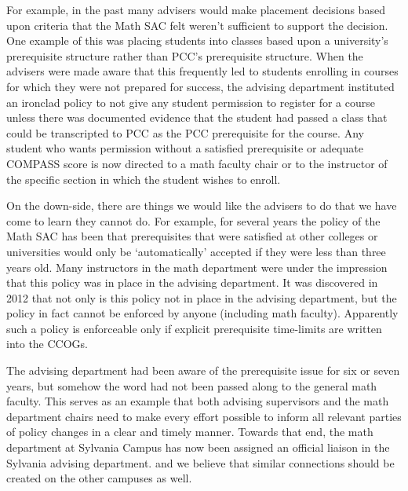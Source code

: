For example, in the past many advisers would make placement decisions based upon criteria that the Math SAC felt weren't sufficient to support the decision.   One example of this was placing students into classes based upon a  university's prerequisite structure rather than PCC's prerequisite structure.   When the advisers were made aware that this frequently led to students enrolling in courses for which they were not prepared for success, the advising department instituted an ironclad policy to not give any student permission to register for a course unless there was documented evidence that the student had passed a class that could be transcripted to PCC as the PCC prerequisite for the course.  Any student who wants permission without a satisfied prerequisite or adequate COMPASS score is now directed to a math faculty chair or to the instructor of the specific section in which the student wishes to enroll.

On the down-side, there are things we would like the advisers to do that we have come to learn they cannot do.  For example, for several years the policy of the Math SAC has been that prerequisites that were satisfied at other colleges or universities would only be `automatically' accepted if they were less than three years old.  Many instructors in the math department were under the impression that this policy was in place in the advising department.  It was discovered in 2012 that not only is this policy not in place in the advising department, but the policy in fact cannot be enforced by anyone (including math faculty).   Apparently such a policy is enforceable only if explicit prerequisite time-limits are written into the CCOGs.  

The advising department had been aware of the prerequisite issue for six or seven years, but somehow the word had not been passed along to the general math faculty.  This serves as an example that both advising supervisors and the math department chairs need to make every effort possible to inform all relevant parties of policy changes in a clear and timely manner.  Towards that end, the math department at Sylvania Campus has now been assigned an official liaison in the Sylvania advising department. and we believe that similar connections should be created on the other campuses as well.

